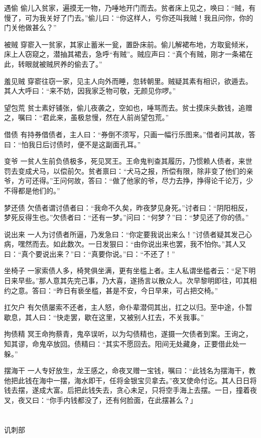 \documentclass[12pt,UTF8]{ctexbook}
\begin{document}
遇偷
偷儿入贫家，遍摸无一物，乃唾地开门而去。贫者床上见之，唤曰：“贼，有慢了，可为我关好了门去。”偷儿曰：“你这样人，亏你还叫我贼！我且问你，你的门关他做甚么？”

被贼
穿窬入一贫家，其家止蓄米一瓮，置卧床前。偷儿解裙布地，方取瓮倾米，床上人窃窥之，潜抽其裙去，急呼“有贼”。贼应声曰：“真个有贼，刚才一条裙在此，转眼就被贼屄养的偷去了。”

羞见贼
穿窬往窃一家，见主人向外而睡，忽转朝里。贼疑其素有相识，欲遁去。其人大呼曰：“来不妨，因我家乏物可敬，无颜见你啰。”

望包荒
贫士素好铺张，偷儿夜袭之，空如也，唾骂而去。贫士摸床头数钱，追赠之，嘱曰：“君此来，虽极怠慢，然在人前尚望包荒。”

借债
有持券借债者，主人曰：“券倒不须写，只画一幅行乐图来。”借者问其故，答曰：“怕我日后讨债时，便不是这副面孔耳。”

变爷
一贫人生前负债极多，死见冥王。王命鬼判查其履历，乃惯赖人债者，来世罚去变成犬马，以偿前欠。贫者禀曰：“犬马之报，所偿有限，除非变了他们的亲爷，方可还得。”王问何故，答曰：“做了他家的爷，尽力去挣，挣得论千论万，少不得都是他们的。”

梦还债
欠债者谓讨债者曰：“我命不久矣，昨夜梦见身死。”讨者曰：“阴阳相反，梦死反得生也。”欠债者曰：“还有一梦。”问曰：“何梦？”曰：“梦见还了你的债。”

说出来
一人为讨债者所逼，乃发急曰：“你定要我说出来么！”讨债者疑其发己心病，嘿然而去。如此数次。一日发狠曰：“由你说出来也罢，我不怕你。”其人又曰：“真个要说出来？”曰：“真要你说。”曰：“不还了！”

坐椅子
一家索债人多，椅凳俱坐满，更有坐槛上者。主人私谓坐槛者云：“足下明日来早些。”那人意其先完己事，乃大喜，遂扬言以散众人。次早黎明即往，叩其相约之意。答曰：“昨日有亵坐槛，甚是不安，今日早来，可占把交椅。”

扛欠户
有欠债屡索不还者，主人怒，命仆辈潜伺其出，扛之以归。至中途，仆暂歇息，其人曰：“快走罢，歇在这里，又被别人扛去，不关我事。”

拘债精
冥王命拘蔡青，鬼卒误听，以为勾债精也，遂摄一欠债者到案。王询之，知其谬，命鬼卒放回。债精曰：“其实不愿回去。阳间无处藏身，正要借此处一躲。”

摆海干
一人专好放生，龙王感之，命夜叉赠一宝钱，嘱曰：“此钱名为摆海干，教他把此钱在海中一摆，海水即干，任将金银宝贝拿去。”夜叉使命付讫。其人日日将钱去摆，遂成大富。后把此钱失去，贪心未足，只将空手海上去摆。一日，撞着夜叉，夜又曰：“你手内钱都没了，还有何脸面，在此摆甚么？」

\part{}
讥刺部
\end{document}
